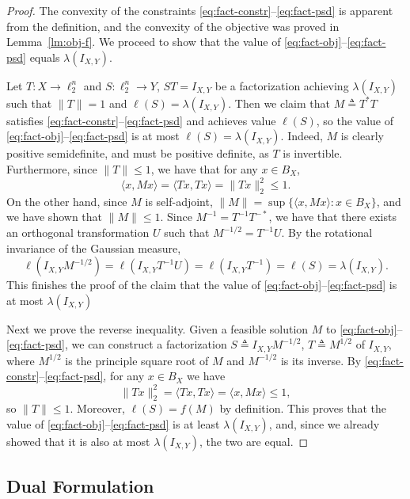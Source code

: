 \documentclass[12pt]{article}
\newcommand{\eqdef}{\triangleq}
\begin{document}
\begin{proof}
  The convexity of the constraints
  \eqref{eq:fact-constr}--\eqref{eq:fact-psd} is apparent from the
  definition, and the convexity of the objective was proved in
  Lemma~\ref{lm:obj-f}. We proceed to show that the value of
  \eqref{eq:fact-obj}--\eqref{eq:fact-psd} equals $\lambda(I_{X,Y})$.

  Let $T:X \to \ell_2^n$ and $S:\ell_2^n \to Y$, $ST = I_{X,Y}$ be a
  factorization achieving $\lambda(I_{X,Y})$ such that $\|T\| = 1$ and
  $\ell(S) = \lambda(I_{X,Y})$. Then we claim that $M \eqdef T^*T$
  satisfies \eqref{eq:fact-constr}--\eqref{eq:fact-psd} and achieves
  value $\ell(S)$, so the value of
  \eqref{eq:fact-obj}--\eqref{eq:fact-psd} is at most
  $\ell(S) = \lambda(I_{X,Y})$. Indeed, $M$ is clearly positive semidefinite,
  and must be positive definite, as $T$ is
  invertible. Furthermore, since $\|T\|\le 1$, we have that for any $x
  \in B_X$,
  \[\langle x, Mx \rangle = \langle Tx, Tx\rangle =
  \|Tx\|^2_2 \le 1.\] 
  On the other hand, since $M$ is self-adjoint,
  $\|M\| = \sup\{\langle x, Mx\rangle: x \in B_X\}$, and we have shown
  that $\|M\| \le 1$. Since $M^{-1} = T^{-1}T^{-*}$, we have that
  there exists an orthogonal transformation $U$ such that $M^{-1/2} =
  T^{-1}U$. By the rotational invariance of the Gaussian measure, 
  \[
  \ell(I_{X,Y}M^{-1/2}) = 
  \ell(I_{X,Y}  T^{-1}U) = 
  \ell(I_{X,Y}  T^{-1})  = \ell(S) = \lambda(I_{X,Y}).
  \]
  This finishes the proof of the claim that the value of
  \eqref{eq:fact-obj}--\eqref{eq:fact-psd} is at most $\lambda(I_{X,Y})$
  
  Next we prove the reverse inequality. Given a feasible solution $M$
  to \eqref{eq:fact-obj}--\eqref{eq:fact-psd}, we can construct a
  factorization $S \eqdef I_{X,Y}M^{-1/2}$, $T \eqdef M^{1/2}$ of
  $I_{X,Y}$, where $M^{1/2}$ is the principle square root of $M$ and
  $M^{-1/2}$ is its inverse. By
  \eqref{eq:fact-constr}--\eqref{eq:fact-psd}, for any $x \in B_X$ we have
  \[
  \|Tx\|^2_2 = \langle Tx, Tx\rangle = \langle x, Mx \rangle  \le
  1,\] so $\|T\| \le 1$. Moreover, $\ell(S) = f(M)$ by
  definition. This proves that the value of
  \eqref{eq:fact-obj}--\eqref{eq:fact-psd} is at least
  $\lambda(I_{X,Y})$, and, since we already showed that it is also at
  most $\lambda(I_{X,Y})$, the two are equal.
\end{proof}

\subsection{Dual Formulation}
\end{document}
